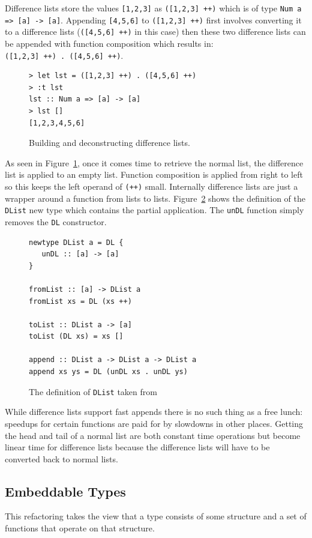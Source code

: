 Difference lists store the values \texttt{[1,2,3]} as \texttt{([1,2,3] ++)} which is of type \texttt{Num a => [a] -> [a]}. Appending \texttt{[4,5,6]} to \texttt{([1,2,3] ++)} first involves converting it to a difference lists (\texttt{([4,5,6] ++)} in this case) then these two difference lists can be appended with function composition which results in: \\ \texttt{([1,2,3] ++) . ([4,5,6] ++)}. 

\begin{figure}[t]
\begin{lstlisting}
> let lst = ([1,2,3] ++) . ([4,5,6] ++)
> :t lst
lst :: Num a => [a] -> [a]
> lst []
[1,2,3,4,5,6]
\end{lstlisting}
\caption{Building and deconstructing difference lists.}
\label{ghciDList}
\end{figure}

As seen in Figure~\ref{ghciDList}, once it comes time to retrieve the normal list, the difference list is applied to an empty list. Function composition is applied from right to left so this keeps the left operand of \texttt{(++)} small. Internally difference lists are just a wrapper around a function from lists to lists. Figure~\ref{dlistDef} shows the definition of the \texttt{DList} new type which contains the partial application. The \texttt{unDL} function simply removes the \texttt{DL} constructor. 

\begin{figure}[t]
\begin{lstlisting}
newtype DList a = DL {
   unDL :: [a] -> [a]
}

fromList :: [a] -> DList a
fromList xs = DL (xs ++)

toList :: DList a -> [a]
toList (DL xs) = xs []

append :: DList a -> DList a -> DList a
append xs ys = DL (unDL xs . unDL ys)
\end{lstlisting}
\caption{The definition of \texttt{DList} taken from~\citep{realWorldHaskell}}
\label{dlistDef}
\end{figure}

While difference lists support fast appends there is no such thing as a free lunch: speedups for certain functions are paid for by slowdowns in other places. Getting the head and tail of a normal list are both constant time operations but become linear time for difference lists because the difference lists will have to be converted back to normal lists. 


\subsection{Embeddable Types} 
This refactoring takes the view that a type consists of some structure and a set of functions that operate on that structure. 

